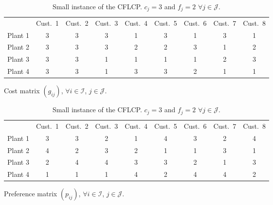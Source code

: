\documentclass[preprint,11pt,authoryear]{elsarticle}
\def\J{\mathcal{J}}
\def\I{\mathcal{I}}
\begin{document}
\begin{table}%
\begin{center}
    \begin{subtable}[h]{\textwidth}
    \begin{center}
    \begin{tabular}{ccccccccc}
    \toprule    
     & Cust.\ 1 & Cust.\ 2 & Cust.\ 3 & Cust.\ 4  & Cust.\ 5 & Cust.\ 6 & Cust.\ 7 & Cust.\ 8  \\ \cmidrule(lr){2-9}
    Plant 1 & 3 &  3 & 3 & 1 & 3 &  1 & 3 & 1 \\ 
    Plant 2 & 3 &  3 & 3 & 2 & 2 &  3 & 1 & 2\\ 
    Plant 3 & 3 &  3 & 1 & 1 & 1 &  1 & 2 & 3\\
    Plant 4 & 3 &  3 & 1 & 3 & 3 &  2 & 1 & 1\\
    \bottomrule
\end{tabular}
       \caption{Cost matrix $(g_{ij})$, $\forall i \in \I$, $j \in \J$.}
       \label{tab:counterexamplecosts}
       \end{center}
    \end{subtable}

    \begin{subtable}[h]{\textwidth}
    \begin{center}
    \begin{tabular}{ccccccccc}
    \toprule    
     & Cust.\ 1 & Cust.\ 2 & Cust.\ 3 & Cust.\ 4   & Cust.\ 5 & Cust.\ 6 & Cust.\ 7 & Cust.\ 8  \\ \cmidrule(lr){2-9}
    Plant 1 & 3 &  3 & 2 & 1  & 4 &  3 & 2 & 4  \\ 
    Plant 2 & 4 &  2 & 3 & 2  & 1 &  1 & 3 & 1 \\ 
    Plant 3 & 2 &  4 & 4 & 3  & 3 &  2 & 1 & 3 \\
    Plant 4 & 1 &  1 & 1 & 4  & 2 &  4 & 4 & 2 \\
    \bottomrule
\end{tabular}
       \caption{Preference matrix $(p_{ij})$, $\forall i \in \I$, $j \in \J$. }
       \label{tab:counterexampleprefs}
       \end{center}
    \end{subtable}
\caption{Small instance of the CFLCP. $c_j=3$ and $f_j=2$ $\forall j \in \J$.} 
\label{tab:counterexample}
\end{center}
\end{table}
\end{document}

